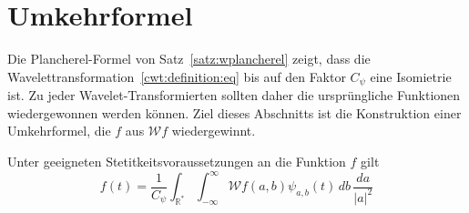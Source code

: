 %
%
%
\section{Umkehrformel%
\label{section:cwt:umkehrformel}}
Die Plancherel-Formel von Satz~\ref{satz:wplancherel} zeigt, dass die
Wavelettransformation~\eqref{cwt:definition:eq} bis auf den Faktor
$C_{\psi}$ eine Isomietrie ist.
Zu jeder Wavelet-Transformierten sollten daher die ursprüngliche
Funktionen wiedergewonnen werden können.
Ziel dieses Abschnitts ist die Konstruktion einer Umkehrformel, 
die $f$ aus $\mathcal{W}f$ wiedergewinnt.

\begin{satz}
Unter geeigneten Stetitkeitsvoraussetzungen an die Funktion $f$ gilt
\begin{equation}
f(t) = \frac{1}{C_{\psi}}\int_{\mathbb R^*}\int_{-\infty}^\infty
\mathcal{W}f(a,b) \psi_{a,b}(t)
\,db\,\frac{da}{|a|^2}
\label{cwt:umkehr}
\end{equation}
\end{satz}

